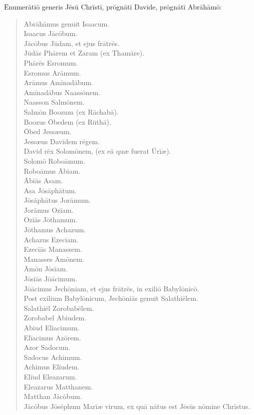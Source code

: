 
\Caput
\Versus Ēnumerātiō generis Jēsū Chrīstī, prōgnātī Davīde, prōgnātī Abrāhāmō:

\begin{verse}
\begin{patverse*}
\Versus Abrāhāmus genuit Isaacum.\\
Isaacus Jācōbum.\\
Jācōbus Jūdam, et ejus frātrēs.\\
\Versus Jūdās Phārem et Zaram (ex Thamāre).\\
Phārēs Esromum.\\
Esromus Arāmum.\\ 
\Versus Arāmus Amīnadābum.\\
Amīnadābus Naassōnem.\\
Naasson Salmōnem.\\
\Versus Salmōn Boozum (ex Rāchabā).\\
Boozus Ōbedem (ex Rūthā).\\
Ōbed Jessæum.\\
\Versus Jessæus Davīdem rēgem.\\
David rēx Solomōnem, (ex eā quæ fuerat Ūrīæ).\\
\Versus Solomō Roboāmum.\\
Roboāmus Ābīam.\\
Ābīās Asam.\\
\Versus Asa Jōsāphātum.\\
Jōsāphātus Jorāmum.\\
Jorāmus Ozīam.\\
\Versus Ozīās Jōthamum.\\
Jōthamus Achazum.\\
Achazus Ezecīam.\\
\Versus Ezecīās Manassem.\\
Manasses Āmōnem.\\
Āmōn Jōsīam.\\ 
\Versus Jōsīās Jōācimum.\\
Jōācimus Jechōniam, et ejus frātrēs, in exiliō Babylōnicō.\\
\Versus Post exilium Babylōnicum, Jechōniās genuit Salathiēlem.\\
Salathiēl Zorobabēlem.\\ 
\Versus Zorobabel Abiudem.\\
Abiud Elīacimum.\\
Elīacimus Azōrem.\\ 
\Versus Azor Sadocum.\\
Sadocus Achimum.\\
Achimus Elīudem.\\ 
\Versus Elīud Eleazarum.\\
Eleazarus Matthanem.\\
Matthan Jācōbum.\\ 
\Versus Jācōbus Jōsēphum Marīæ virum, ex quā nātus est Jēsūs nōmine Chrīstus.
\end{patverse*}
\end{verse}

